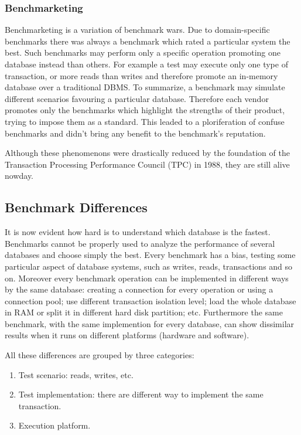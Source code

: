 		\subsubsection{Benchmarketing}
Benchmarketing is a variation of benchmark wars. Due to domain-specific benchmarks there was always a benchmark which rated a particular system the best. Such benchmarks may perform only a specific operation promoting one database instead than others. For example a test may execute only one type of transaction, or more reads than writes and therefore promote an in-memory database over a traditional DBMS. To summarize, a benchmark may simulate different scenarios favouring a particular database. Therefore each vendor promotes only the benchmarks which highlight the strengths of their product, trying to impose them as a standard. This leaded to a ploriferation of confuse benchmarks and didn't bring any benefit to the benchmark's reputation.

		\vspace{0.5cm}
Although these phenomenons were drastically reduced by the foundation of the Transaction Processing Performance Council (TPC) in 1988, they are still alive nowday.

		\subsection{Benchmark Differences} \label{categories}
It is now evident how hard is to understand which database is the fastest. Benchmarks cannot be properly used to analyze the performance of several databases and choose simply the best. Every benchmark has a bias, testing some particular aspect of database systems, such as writes, reads, transactions and so on. Moreover every benchmark operation can be implemented in different ways by the same database: creating a connection for every operation or using a connection pool; use different transaction isolation level; load the whole database in RAM or split it in different hard disk partition; etc. Furthermore the same benchmark, with the same implemention for every database, can show dissimilar results when it runs on different platforms (hardware and software).

All these differences are grouped by three categories:
\begin{enumerate}
	\item Test scenario: reads, writes, etc.
	\item Test implementation: there are different way to implement the same transaction.
	\item Execution platform.
\end{enumerate}
	
